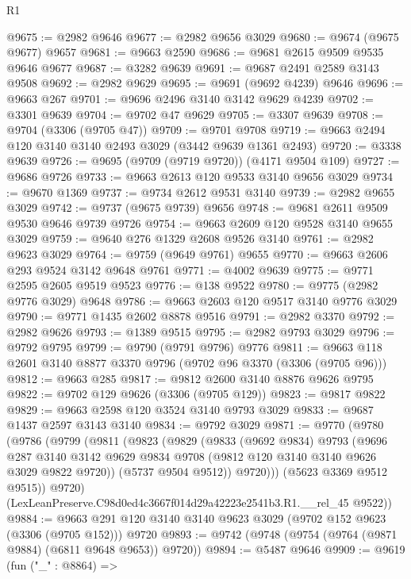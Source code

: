 \begin{lexlean}{R1}
\begin{coremodule}
@9675 := @2982 @9646
@9677 := @2982 @9656 @3029
@9680 := @9674 (@9675 @9677) @9657
@9681 := @9663 @2590
@9686 := @9681 @2615 @9509 @9535 @9646 @9677
@9687 := @3282 @9639
@9691 := @9687 @2491 @2589 @3143 @9508
@9692 := @2982 @9629
@9695 := @9691 (@9692 @4239) @9646
@9696 := @9663 @267
@9701 := @9696 @2496 @3140 @3142 @9629 @4239
@9702 := @3301 @9639
@9704 := @9702 @47 @9629
@9705 := @3307 @9639
@9708 := @9704 (@3306 (@9705 @47))
@9709 := @9701 @9708
@9719 := @9663 @2494 @120 @3140 @3140 @2493 @3029 (@3442 @9639 @1361 @2493)
@9720 := @3338 @9639
@9726 := @9695 (@9709 (@9719 @9720)) (@4171 @9504 @109)
@9727 := @9686 @9726
@9733 := @9663 @2613 @120 @9533 @3140 @9656 @3029
@9734 := @9670 @1369
@9737 := @9734 @2612 @9531 @3140
@9739 := @2982 @9655 @3029
@9742 := @9737 (@9675 @9739) @9656
@9748 := @9681 @2611 @9509 @9530 @9646 @9739 @9726
@9754 := @9663 @2609 @120 @9528 @3140 @9655 @3029
@9759 := @9640 @276 @1329 @2608 @9526 @3140
@9761 := @2982 @9623 @3029
@9764 := @9759 (@9649 @9761) @9655
@9770 := @9663 @2606 @293 @9524 @3142 @9648 @9761
@9771 := @4002 @9639
@9775 := @9771 @2595 @2605 @9519 @9523
@9776 := @138 @9522
@9780 := @9775 (@2982 @9776 @3029) @9648
@9786 := @9663 @2603 @120 @9517 @3140 @9776 @3029
@9790 := @9771 @1435 @2602 @8878 @9516
@9791 := @2982 @3370
@9792 := @2982 @9626
@9793 := @1389 @9515
@9795 := @2982 @9793 @3029
@9796 := @9792 @9795
@9799 := @9790 (@9791 @9796) @9776
@9811 := @9663 @118 @2601 @3140 @8877 @3370 @9796 (@9702 @96 @3370 (@3306 (@9705 @96)))
@9812 := @9663 @285
@9817 := @9812 @2600 @3140 @8876 @9626 @9795
@9822 := @9702 @129 @9626 (@3306 (@9705 @129))
@9823 := @9817 @9822
@9829 := @9663 @2598 @120 @3524 @3140 @9793 @3029
@9833 := @9687 @1437 @2597 @3143 @3140
@9834 := @9792 @3029
@9871 := @9770
    (@9780
      (@9786
        (@9799
          (@9811
            (@9823
              (@9829
                (@9833
                  (@9692 @9834)
                  @9793
                  (@9696
                    @287
                    @3140
                    @3142
                    @9629
                    @9834
                    @9708
                    (@9812 @120 @3140 @3140 @9626 @3029 @9822 @9720))
                  (@5737 @9504 @9512))
                @9720)))
          (@5623 @3369 @9512 @9515))
        @9720)
      (LexLeanPreserve.C98d0ed4c3667f014d29a42223e2541b3.R1.__rel_45 @9522))
@9884 := @9663 @291 @120 @3140 @3140 @9623 @3029 (@9702 @152 @9623 (@3306 (@9705 @152))) @9720
@9893 := @9742 (@9748 (@9754 (@9764 (@9871 @9884) (@6811 @9648 @9653)) @9720))
@9894 := @5487 @9646
@9909 := @9619
    (fun ("_" : @8864) =>

\end{coremodule}
\end{lexlean}
